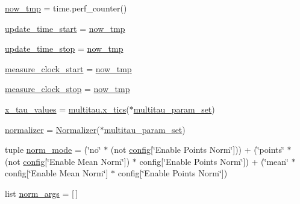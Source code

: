 \begin{DoxyCompactItemize}
\item 
\hyperlink{namespacephoton__statistics_a421423fcce411e182e41fde2e450d2d9}{now\+\_\+tmp} = time.\+perf\+\_\+counter()
\item 
\hyperlink{namespacephoton__statistics_a2c4e09ca6009ec89417e7fb1842dc290}{update\+\_\+time\+\_\+start} = \hyperlink{namespacephoton__statistics_a421423fcce411e182e41fde2e450d2d9}{now\+\_\+tmp}
\item 
\hyperlink{namespacephoton__statistics_a1353da1c17a4f960cbacf200dcf13d4f}{update\+\_\+time\+\_\+stop} = \hyperlink{namespacephoton__statistics_a421423fcce411e182e41fde2e450d2d9}{now\+\_\+tmp}
\item 
\hyperlink{namespacephoton__statistics_a5c7400e3258e9336ce831f0fbda24f33}{measure\+\_\+clock\+\_\+start} = \hyperlink{namespacephoton__statistics_a421423fcce411e182e41fde2e450d2d9}{now\+\_\+tmp}
\item 
\hyperlink{namespacephoton__statistics_a328243354a643086bd68145d804782d0}{measure\+\_\+clock\+\_\+stop} = \hyperlink{namespacephoton__statistics_a421423fcce411e182e41fde2e450d2d9}{now\+\_\+tmp}
\item 
\hyperlink{namespacephoton__statistics_a930bc99eb656180a9ae6318b16d77976}{x\+\_\+tau\+\_\+values} = \hyperlink{namespacemultitau_a775aea685fe55a6707400660fadf9c35}{multitau.\+x\+\_\+tics}($\ast$\hyperlink{namespacephoton__statistics_a3c57d728c4b1cdcb2b6ca63bc6adfc4d}{multitau\+\_\+param\+\_\+set})
\item 
\hyperlink{namespacephoton__statistics_a4476861cf199e5ef481ee4bc15e08847}{normalizer} = \hyperlink{classnormalizer_1_1Normalizer}{Normalizer}($\ast$\hyperlink{namespacephoton__statistics_a3c57d728c4b1cdcb2b6ca63bc6adfc4d}{multitau\+\_\+param\+\_\+set})
\item 
tuple \hyperlink{namespacephoton__statistics_a28a89caae4538b504046ed301158e677}{norm\+\_\+mode} = (\char`\"{}no\char`\"{} $\ast$ (not \hyperlink{namespacephoton__statistics_a4176c548148b1c86da6ddf320ab00e90}{config}\mbox{[}\char`\"{}Enable Points Norm\char`\"{}\mbox{]})) + (\char`\"{}points\char`\"{} $\ast$ (not \hyperlink{namespacephoton__statistics_a4176c548148b1c86da6ddf320ab00e90}{config}\mbox{[}\char`\"{}Enable Mean Norm\char`\"{}\mbox{]}) $\ast$ config\mbox{[}\char`\"{}Enable Points Norm\char`\"{}\mbox{]}) + (\char`\"{}mean\char`\"{} $\ast$ config\mbox{[}\char`\"{}Enable Mean Norm\char`\"{}\mbox{]} $\ast$ config\mbox{[}\char`\"{}Enable Points Norm\char`\"{}\mbox{]})
\item 
list \hyperlink{namespacephoton__statistics_af558fed5a93a7b134efea382f1ad4007}{norm\+\_\+args} = \mbox{[}$\,$\mbox{]}

\end{DoxyCompactItemize}
